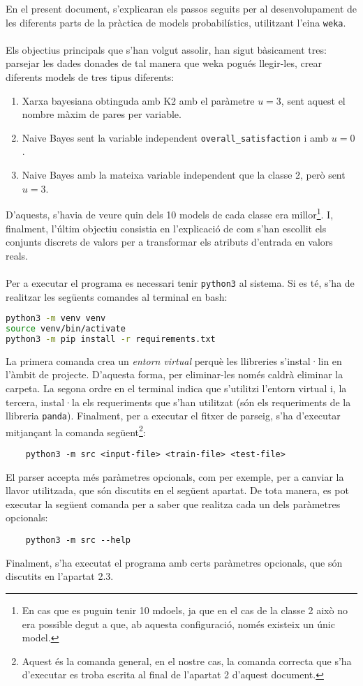
En el present document, s'explicaran els passos seguits per al desenvolupament de les diferents parts de la pràctica de models probabilístics, utilitzant l'eina \texttt{weka}.\\\\
Els objectius principals que s'han volgut assolir, han sigut bàsicament tres: parsejar les dades donades de tal manera que weka pogués llegir-les, crear diferents models de tres tipus diferents: 
\begin{enumerate}
	\item Xarxa bayesiana obtinguda amb K2 amb el paràmetre $u=3$, sent aquest el nombre màxim de pares per variable.
	\item Naive Bayes sent la variable independent \texttt{overall\_satisfaction} i amb $u=0$.
	\item Naive Bayes amb la mateixa variable independent que la classe 2, però sent $u=3$.
\end{enumerate}
D'aquests, s'havia de veure quin dels 10 models de cada classe era millor\footnote{En cas que es puguin tenir 10 mdoels, ja que en el cas de la classe 2 això no era possible degut a que, ab aquesta configuració, només existeix un únic model.}. I, finalment, l'últim objectiu consistia en l'explicació de com s'han escollit els conjunts discrets de valors per a transformar els atributs d'entrada en valors reals.\\
\\
Per a executar el programa es necessari tenir \texttt{python3} al sistema. Si es té,
s'ha de realitzar les següents comandes al terminal en bash:
\begin{lstlisting}[language=bash]
python3 -m venv venv
source venv/bin/activate
python3 -m pip install -r requirements.txt
\end{lstlisting}
La primera comanda crea un \textit{entorn virtual} perquè les llibreries s'instal·lin en l'àmbit de projecte. D'aquesta
forma, per eliminar-les només caldrà eliminar la carpeta. La segona ordre en el terminal 
indica que s'utilitzi l'entorn virtual i, la tercera, instal·la els requeriments que s'han 
utilitzat (són els requeriments de la llibreria \texttt{panda}). Finalment, per a executar el fitxer
de parseig, s'ha d'executar mitjançant la comanda següent\footnote{Aquest és la comanda general, en el nostre cas, la comanda correcta que s'ha d'executar es troba escrita al final de l'apartat 2 d'aquest document.}:
\begin{verbatim}
	python3 -m src <input-file> <train-file> <test-file>
\end{verbatim}
El parser accepta més paràmetres opcionals, com per exemple, per a canviar la llavor utilitzada,
que són discutits en el següent apartat. De tota manera, es pot executar la següent comanda per
a saber que realitza cada un dels paràmetres opcionals:
\begin{verbatim}
	python3 -m src --help
\end{verbatim}
Finalment, s'ha executat el programa amb certs paràmetres opcionals, que són discutits en 
l'apartat 2.3.

